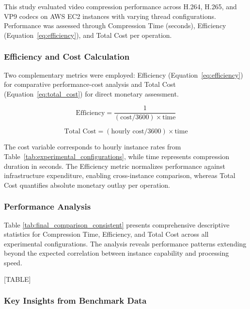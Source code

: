 \documentclass[conference]{IEEEtran}
\begin{document}
	This study evaluated video compression performance across H.264, H.265, and VP9 codecs on AWS EC2 instances with varying thread configurations. Performance was assessed through Compression Time (seconds), Efficiency (Equation~\ref{eq:efficiency}), and Total Cost per operation.
	
	\subsubsection{Efficiency and Cost Calculation}
	\label{efficiency-calculation}
	
	Two complementary metrics were employed: Efficiency (Equation~\ref{eq:efficiency}) for comparative performance-cost analysis and Total Cost (Equation~\ref{eq:total_cost}) for direct monetary assessment.
	
	\begin{equation}
		\text{Efficiency} = \frac{1}{(\text{cost}/3600) \times \text{time}}
		\label{eq:efficiency}
	\end{equation}
	
	\begin{equation}
		\text{Total Cost} = (\text{hourly cost}/3600) \times \text{time}
		\label{eq:total_cost}
	\end{equation}
	
	The cost variable corresponds to hourly instance rates from Table~\ref{tab:experimental_configurations}, while time represents compression duration in seconds. The Efficiency metric normalizes performance against infrastructure expenditure, enabling cross-instance comparison, whereas Total Cost quantifies absolute monetary outlay per operation.
	
	\subsubsection{Performance Analysis}
	
	Table \ref{tab:final_comparison_consistent} presents comprehensive descriptive statistics for Compression Time, Efficiency, and Total Cost across all experimental configurations. The analysis reveals performance patterns extending beyond the expected correlation between instance capability and processing speed.
	
	[TABLE]
	
	\subsubsection{Key Insights from Benchmark Data}
	
\end{document}
